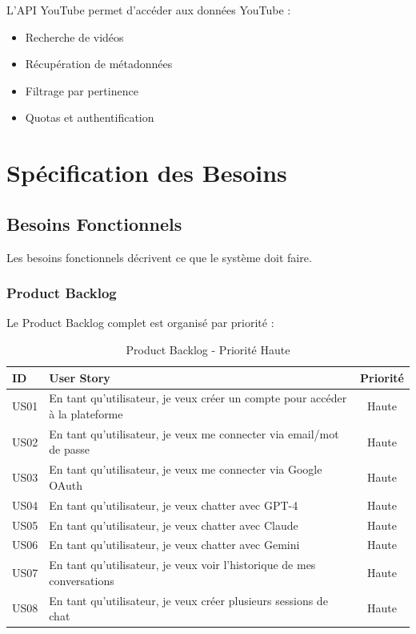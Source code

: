 L'API YouTube permet d'accéder aux données YouTube :
\begin{itemize}
    \item Recherche de vidéos
    \item Récupération de métadonnées
    \item Filtrage par pertinence
    \item Quotas et authentification
\end{itemize}

\section{Spécification des Besoins}

\subsection{Besoins Fonctionnels}

Les besoins fonctionnels décrivent ce que le système doit faire.

\subsubsection{Product Backlog}

Le Product Backlog complet est organisé par priorité :

\begin{table}[H]
\centering
\caption{Product Backlog - Priorité Haute}
\label{tab:backlog-haute}
\begin{tabular}{|l|p{8cm}|c|}
\hline
\textbf{ID} & \textbf{User Story} & \textbf{Priorité} \\
\hline
US01 & En tant qu'utilisateur, je veux créer un compte pour accéder à la plateforme & Haute \\
\hline
US02 & En tant qu'utilisateur, je veux me connecter via email/mot de passe & Haute \\
\hline
US03 & En tant qu'utilisateur, je veux me connecter via Google OAuth & Haute \\
\hline
US04 & En tant qu'utilisateur, je veux chatter avec GPT-4 & Haute \\
\hline
US05 & En tant qu'utilisateur, je veux chatter avec Claude & Haute \\
\hline
US06 & En tant qu'utilisateur, je veux chatter avec Gemini & Haute \\
\hline
US07 & En tant qu'utilisateur, je veux voir l'historique de mes conversations & Haute \\
\hline
US08 & En tant qu'utilisateur, je veux créer plusieurs sessions de chat & Haute \\
\hline
\end{tabular}
\end{table}

